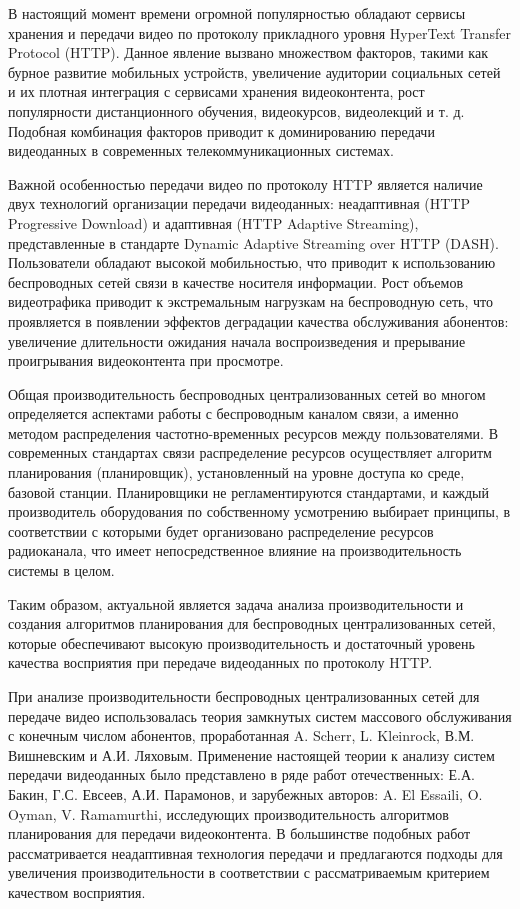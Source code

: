 {\actuality}
В настоящий момент времени огромной популярностью обладают сервисы хранения и передачи видео по протоколу прикладного уровня HyperText Transfer Protocol (HTTP). Данное явление вызвано множеством факторов, такими как бурное развитие мобильных устройств, увеличение аудитории социальных сетей и их плотная интеграция с сервисами хранения видеоконтента, рост популярности дистанционного обучения, видеокурсов, видеолекций и т. д. Подобная комбинация факторов приводит к доминированию передачи видеоданных в современных телекоммуникационных системах.

Важной особенностью передачи видео по протоколу HTTP является наличие двух технологий организации передачи видеоданных: неадаптивная (HTTP Progressive Download) и адаптивная (HTTP Adaptive Streaming), представленные в стандарте Dynamic Adaptive Streaming over HTTP (DASH). Пользователи обладают высокой мобильностью, что приводит к использованию беспроводных сетей связи в качестве носителя информации. Рост объемов видеотрафика приводит к экстремальным нагрузкам на беспроводную сеть, что проявляется в появлении эффектов деградации качества обслуживания абонентов: увеличение длительности ожидания начала воспроизведения и прерывание проигрывания видеоконтента при просмотре.

Общая производительность беспроводных централизованных сетей во многом определяется аспектами работы с беспроводным каналом связи, а именно методом распределения частотно-временных ресурсов между пользователями. В современных стандартах связи распределение ресурсов осуществляет алгоритм планирования (планировщик), установленный на уровне доступа ко среде, базовой станции. Планировщики не регламентируются стандартами, и каждый производитель оборудования по собственному усмотрению выбирает принципы, в соответствии с которыми будет организовано распределение ресурсов радиоканала, что имеет непосредственное влияние на производительность системы в целом.

Таким образом, актуальной является задача анализа производительности и создания алгоритмов планирования для беспроводных централизованных сетей, которые обеспечивают высокую производительность и достаточный уровень качества восприятия при передаче видеоданных по протоколу HTTP.

При анализе производительности беспроводных централизованных сетей для передаче видео использовалась теория замкнутых систем массового обслуживания с конечным числом абонентов, проработанная A. Scherr, L. Kleinrock, В.М. Вишневским и А.И. Ляховым. Применение настоящей теории к анализу систем передачи видеоданных было представлено в ряде работ отечественных: Е.А. Бакин, Г.С. Евсеев, А.И. Парамонов, и зарубежных авторов: A. El Essaili, O. Oyman, V. Ramamurthi, исследующих производительность алгоритмов планирования для передачи видеоконтента. В большинстве подобных работ рассматривается неадаптивная технология передачи и предлагаются подходы для увеличения производительности в соответствии с рассматриваемым критерием качеством восприятия.

